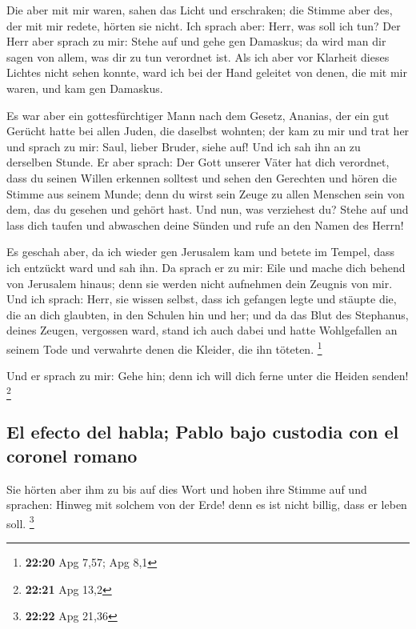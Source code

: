 Die aber mit mir waren, sahen das Licht und erschraken;
die Stimme aber des, der mit mir redete, hörten sie nicht.
 Ich sprach aber: Herr, was soll ich tun? Der Herr aber
sprach zu mir: Stehe auf und gehe gen Damaskus; da wird man dir sagen
von allem, was dir zu tun verordnet ist.  Als ich aber
vor Klarheit dieses Lichtes nicht sehen konnte, ward ich bei der Hand
geleitet von denen, die mit mir waren, und kam gen Damaskus.

 Es war aber ein gottesfürchtiger Mann nach dem Gesetz,
Ananias, der ein gut Gerücht hatte bei allen Juden, die daselbst
wohnten;  der kam zu mir und trat her und sprach zu mir:
Saul, lieber Bruder, siehe auf! Und ich sah ihn an zu derselben Stunde.
 Er aber sprach: Der Gott unserer Väter hat dich
verordnet, dass du seinen Willen erkennen solltest und sehen den
Gerechten und hören die Stimme aus seinem Munde;  denn du
wirst sein Zeuge zu allen Menschen sein von dem, das du gesehen und
gehört hast.  Und nun, was verziehest du? Stehe auf und
lass dich taufen und abwaschen deine Sünden und rufe an den Namen des
Herrn!

 Es geschah aber, da ich wieder gen Jerusalem kam und
betete im Tempel, dass ich entzückt ward und sah ihn.  Da
sprach er zu mir: Eile und mache dich behend von Jerusalem hinaus; denn
sie werden nicht aufnehmen dein Zeugnis von mir.  Und ich
sprach: Herr, sie wissen selbst, dass ich gefangen legte und stäupte
die, die an dich glaubten, in den Schulen hin und her; 
und da das Blut des Stephanus, deines Zeugen, vergossen ward, stand ich
auch dabei und hatte Wohlgefallen an seinem Tode und verwahrte denen die
Kleider, die ihn töteten. \footnote{\textbf{22:20} Apg 7,57; Apg 8,1}

 Und er sprach zu mir: Gehe hin; denn ich will dich ferne
unter die Heiden senden! \footnote{\textbf{22:21} Apg 13,2}

\hypertarget{el-efecto-del-habla-pablo-bajo-custodia-con-el-coronel-romano}{%
\subsection{El efecto del habla; Pablo bajo custodia con el coronel
romano}\label{el-efecto-del-habla-pablo-bajo-custodia-con-el-coronel-romano}}

 Sie hörten aber ihm zu bis auf dies Wort und hoben ihre
Stimme auf und sprachen: Hinweg mit solchem von der Erde! denn es ist
nicht billig, dass er leben soll. \footnote{\textbf{22:22} Apg 21,36}

